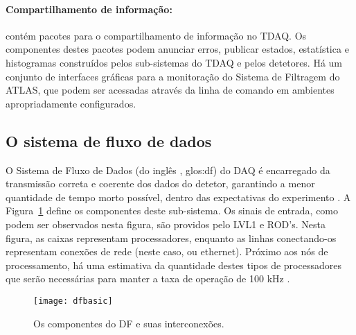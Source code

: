 \paragraph{Compartilhamento de informação:} contém pacotes para o
compartilhamento de informação no TDAQ. Os componentes destes pacotes podem
anunciar erros, publicar estados, estatística e histogramas construídos pelos
sub-sistemas do TDAQ e pelos detetores. Há um conjunto de interfaces gráficas
para a monitoração do Sistema de Filtragem do ATLAS, que podem ser acessadas
através da linha de comando em ambientes apropriadamente configurados.



\subsection{O sistema de fluxo de dados}
\label{sec:dataflow}

O Sistema de Fluxo de Dados (do inglês , \gls{glos:df}) do DAQ é
encarregado da transmissão correta e coerente dos dados do detetor, garantindo
a menor quantidade de tempo morto possível, dentro das expectativas do
experimento \cite{aa:chep-2003-2, aa:rt-2003, aa:tns-2004-3}. A
Figura~\ref{fig:dfbasic} define os componentes deste sub-sistema. Os sinais de
entrada, como podem ser observados nesta figura, são providos pelo LVL1 e
ROD's. Nesta figura, as caixas representam processadores, enquanto as linhas
conectando-os representam conexões de rede (neste caso,  ou
 ethernet). Próximo aos nós de processamento, há uma
estimativa da quantidade destes tipos de processadores que serão necessárias
para manter a taxa de operação de 100 kHz \cite{hlt-tdr}.

\begin{figure}
\begin{center}
\texttt{[image: dfbasic]}
\end{center}
\caption{Os componentes do DF e suas interconexões.}
\label{fig:dfbasic}
\end{figure}

